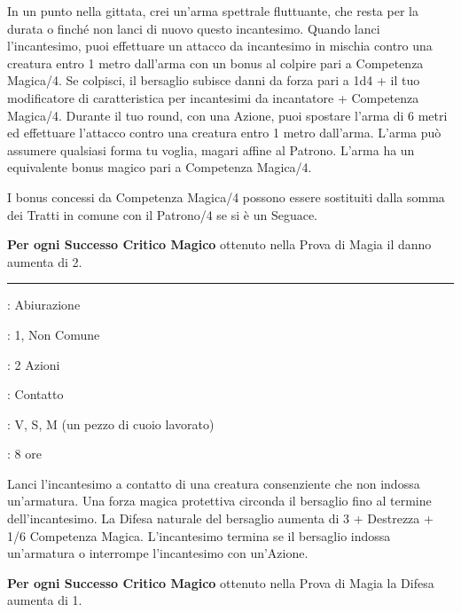\begin{multicols}{2}
In un punto nella gittata, crei un'arma spettrale fluttuante, che resta per la durata o finché non lanci di nuovo questo incantesimo. Quando lanci l'incantesimo, puoi effettuare un attacco da incantesimo in mischia contro una creatura entro 1 metro dall'arma con un bonus al colpire pari a Competenza Magica/4. Se colpisci, il bersaglio subisce danni da forza pari a 1d4 + il tuo modificatore di caratteristica per incantesimi da incantatore + Competenza Magica/4. Durante il tuo round, con una Azione, puoi spostare l'arma di 6 metri ed effettuare l'attacco contro una creatura entro 1 metro dall'arma. L'arma può assumere qualsiasi forma tu voglia, magari affine al Patrono. L'arma ha un equivalente bonus magico pari a Competenza Magica/4.

I bonus concessi da Competenza Magica/4 possono essere sostituiti dalla somma dei Tratti in comune con il Patrono/4 se si è un Seguace.

\textbf{Per ogni Successo Critico Magico} ottenuto nella Prova di Magia il danno aumenta di 2.

\smallskip\noindent\rule{\linewidth}{2pt} \hypertarget{Armatura Magica}{}\medskip{}
\noindent
\begin{description}[noitemsep, topsep=0pt, parsep=0pt, partopsep=0pt, leftmargin=0cm, labelwidth=2.8cm]
	\item[\textbf{Lista di Magia}]: Abiurazione
	\item[\textbf{Livello}]: 1, Non Comune
	\item[\textbf{T. di Lancio}]: 2 Azioni
	\item[\textbf{Gittata}]: Contatto
	\item[\textbf{Componenti}]: V, S, M (un pezzo di cuoio lavorato)
	\item[\textbf{Durata}]: 8 ore
\end{description}

Lanci l'incantesimo a contatto di una creatura consenziente che non indossa un'armatura. Una forza magica protettiva circonda il bersaglio fino al termine dell'incantesimo. La Difesa naturale del bersaglio aumenta di 3 + Destrezza + 1/6 Competenza Magica. L'incantesimo termina se il bersaglio indossa un'armatura o interrompe l'incantesimo con un'Azione.

\textbf{Per ogni Successo Critico Magico} ottenuto nella Prova di Magia la Difesa aumenta di 1.


\end{multicols}

